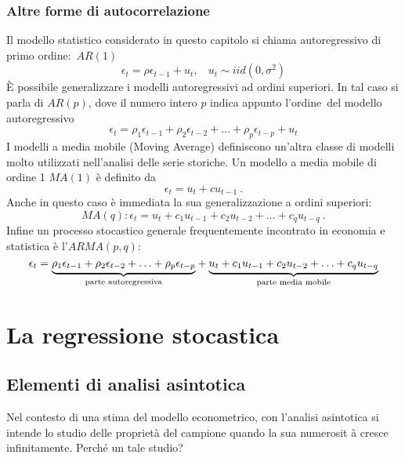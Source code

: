 \documentclass[a4paper]{report}
\newcounter{def}
\theoremstyle{remark}
\begin{document}
\section{Altre forme di autocorrelazione}

Il modello statistico considerato in questo capitolo si chiama
autoregressivo di primo ordine:\ $AR(1)$%
\begin{equation*}
\epsilon _{t}=\rho \epsilon _{t-1}+u_{t},\ \ \ \ u_{t}\sim iid(0,\sigma ^{2})
\end{equation*}%
\`{E} possibile generalizzare i modelli autoregressivi ad ordini superiori.
In tal caso si parla di $AR(p)$, dove il numero intero $p$ indica appunto
l'ordine\ del modello autoregressivo%
\begin{equation*}
\epsilon _{t}=\rho _{1}\epsilon _{t-1}+\rho _{2}\epsilon _{t-2}+\ldots +\rho
_{p}\epsilon _{t-p}+u_{t}
\end{equation*}%
I modelli a media mobile (Moving Average) definiscono un'altra classe di
modelli molto utilizzati nell'analisi delle serie storiche. Un modello a
media mobile di ordine 1 $MA(1)$ \`{e} definito da%
\begin{equation*}
\epsilon _{t}=u_{t}+cu_{t-1}\ .
\end{equation*}%
Anche in questo caso \`{e} immediata la sua generalizzazione a ordini
superiori: 
\begin{equation*}
MA(q):\epsilon _{t}=u_{t}+c_{1}u_{t-1}+c_{2}u_{t-2}+\ldots +c_{q}u_{t-q}\ .
\end{equation*}%
Infine un processo stocastico generale frequentemente incontrato in economia
e statistica \`{e} l'$ARMA(p,q):$%
\begin{equation*}
\epsilon _{t}=\underset{\text{parte autoregressiva}}{\underbrace{\rho
_{1}\epsilon _{t-1}+\rho _{2}\epsilon _{t-2}+\ldots +\rho _{p}\epsilon _{t-p}%
}}+\underset{\text{parte media mobile}}{\underbrace{%
u_{t}+c_{1}u_{t-1}+c_{2}u_{t-2}+\ldots +c_{q}u_{t-q}}}
\end{equation*}

\part{La regressione stocastica}

\chapter{Elementi di analisi asintotica}

Nel contesto di una stima del modello econometrico, con l'analisi asintotica
si intende lo studio delle propriet\`{a} del campione quando la sua numerosit%
\`{a} cresce infinitamente. Perch\'{e} un tale studio?
\end{document}
